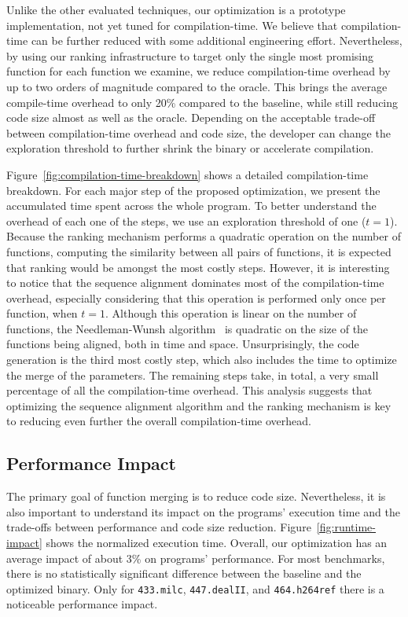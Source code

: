 Unlike the other evaluated techniques, our optimization is a prototype
implementation, not yet tuned for compilation-time.
We believe that compilation-time can be further reduced with some additional engineering effort.
Nevertheless, by using our ranking infrastructure to target only the single most promising function for each function we examine,
we reduce compilation-time overhead by up to two orders of magnitude compared to the oracle.
This brings the average compile-time overhead to only 20\% compared to the baseline, while
still reducing code size almost as well as the oracle.
Depending on the acceptable trade-off between compilation-time overhead and code size,
the developer can change the exploration threshold to further shrink the binary or
accelerate compilation.

Figure~\ref{fig:compilation-time-breakdown} shows a detailed compilation-time
breakdown.
For each major step of the proposed optimization, we present the accumulated
time spent across the whole program.
To better understand the overhead of each one of the steps, we use
an exploration threshold of one ($t = 1$).
Because the ranking mechanism performs a quadratic operation on the number of
functions, computing the similarity between all pairs of functions, it is
expected that ranking would be amongst the most costly steps.
However, it is interesting to notice that the sequence alignment dominates most
of the compilation-time overhead, especially considering that this operation is
performed only once per function, when $t = 1$.
Although this operation is linear on the number of functions, the
Needleman-Wunsh algorithm~\cite{needleman70} is quadratic on the size of the
functions being aligned, both in time and space.
Unsurprisingly, the code generation is the third most costly step, which also
includes the time to optimize the merge of the parameters.
The remaining steps take, in total, a very small percentage of all the
compilation-time overhead.
This analysis suggests that optimizing the sequence alignment algorithm and
the ranking mechanism is key to reducing even further the overall
compilation-time overhead.

\vspace{-1ex}
\subsection{Performance Impact}


The primary goal of function merging is to reduce code size.
Nevertheless, it is also important to understand its impact on the programs'
execution time and the trade-offs between performance and code size reduction.
Figure~\ref{fig:runtime-impact} shows the normalized execution time.
Overall, our optimization has an average impact of about 3\% on programs' performance.
For most benchmarks, there is no statistically significant difference between
the baseline and the optimized binary. Only for \texttt{433.milc}, \texttt{447.dealII},
and \texttt{464.h264ref} there is a noticeable performance impact.

